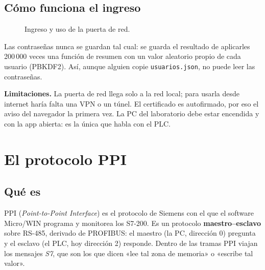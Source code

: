 \documentclass[a4paper,11pt]{article}
\newcommand{\codigo}[1]{\texttt{#1}}
\newcommand{\limite}[1]{\par\smallskip\noindent\colorbox{rojo!8}{\parbox{\dimexpr\linewidth-2\fboxsep}{\textbf{\color{rojo}Limitaciones.} #1}}\par\smallskip}
\begin{document}
\subsection{Cómo funciona el ingreso}
\begin{figure}[H]
\centering
{}
\caption{Ingreso y uso de la puerta de red.}
\end{figure}

Las contraseñas nunca se guardan tal cual: se guarda el resultado de aplicarles 200\,000 veces una función de resumen con un valor aleatorio propio de cada usuario (PBKDF2). Así, aunque alguien copie \codigo{usuarios.json}, no puede leer las contraseñas.

\limite{La puerta de red llega solo a la red local; para usarla desde internet haría falta una VPN o un túnel. El certificado es autofirmado, por eso el aviso del navegador la primera vez. La PC del laboratorio debe estar encendida y con la app abierta: es la única que habla con el PLC.}

\section{El protocolo PPI}\label{sec:ppi}

\subsection{Qué es}
PPI (\emph{Point-to-Point Interface}) es el protocolo de Siemens con el que el software Micro/WIN programa y monitorea los S7-200. Es un protocolo \textbf{maestro--esclavo} sobre RS-485, derivado de PROFIBUS: el maestro (la PC, dirección 0) pregunta y el esclavo (el PLC, hoy dirección 2) responde. Dentro de las tramas PPI viajan los mensajes \emph{S7}, que son los que dicen «lee tal zona de memoria» o «escribe tal valor».
\end{document}
